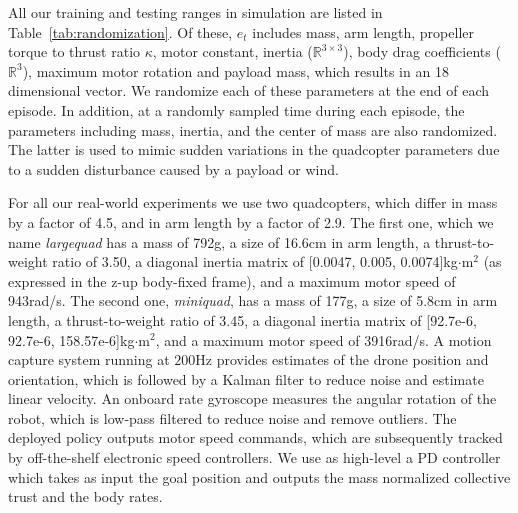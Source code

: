 All our training and testing ranges in simulation are listed in Table~\ref{tab:randomization}. Of these, $e_t$ includes mass, arm length, propeller torque to thrust ratio $\kappa$, motor constant, inertia ($\mathbb{R}^{3\times3}$), body drag coefficients ($\mathbb{R}^{3}$), maximum motor rotation and payload mass, which results in an 18 dimensional vector.
%
We randomize each of these parameters at the end of each episode. In addition, at a randomly sampled time during each episode, the parameters including mass, inertia, and the center of mass are also randomized. 
%
The latter is used to mimic sudden variations in the quadcopter parameters due to a sudden disturbance caused by a payload or wind.



 For all our real-world experiments we use two quadcopters, which differ in mass by a factor of 4.5, and in arm length by a factor of 2.9. 
The first one, which we name \emph{largequad} has a mass of 792g, a size of 16.6cm in arm length, a thrust-to-weight ratio of 3.50, a diagonal inertia matrix of [0.0047, 0.005, 0.0074]kg$\cdot$m$^2$ (as expressed in the z-up body-fixed frame), and a maximum motor speed of 943rad/s. The second one, \emph{miniquad}, has a mass of 177g, a size of 5.8cm in arm length, a thrust-to-weight ratio of 3.45, a diagonal inertia matrix of [92.7e-6, 92.7e-6, 158.57e-6]kg$\cdot$m$^2$, and a maximum motor speed of 3916rad/s.
%
A motion capture system running at $200$Hz provides estimates of the drone position and orientation, which is followed by a Kalman filter to reduce noise and estimate linear velocity.
%
An onboard rate gyroscope measures the angular rotation of the robot, which is low-pass filtered to reduce noise and remove outliers.
%
The deployed policy outputs motor speed commands, which are subsequently tracked by off-the-shelf electronic speed controllers.
%
We use as high-level a PD controller which takes as input the goal position and outputs the mass normalized collective trust and the body rates.

